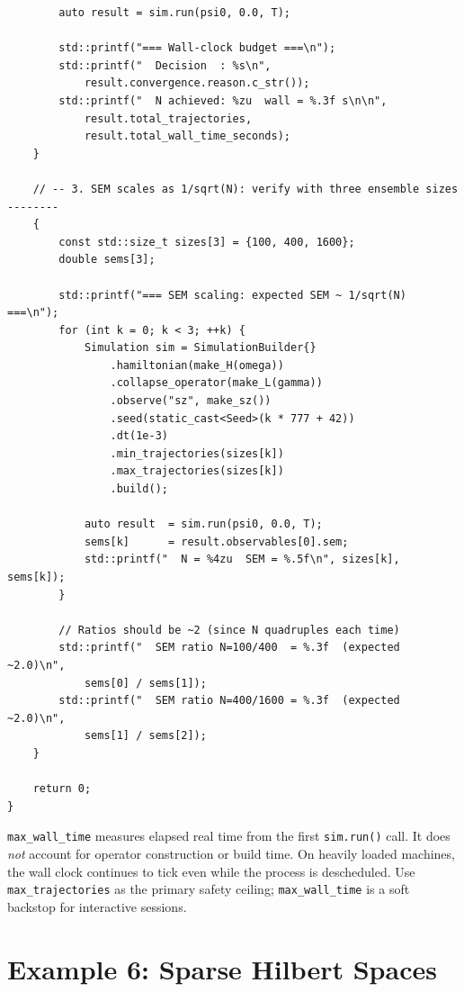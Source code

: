 \documentclass[11pt,a4paper,twoside]{book}
\newcommand{\code}[1]{\texttt{\small#1}}
\theoremstyle{definition}
\theoremstyle{remark}
\begin{document}
\begin{verbatim}
        auto result = sim.run(psi0, 0.0, T);

        std::printf("=== Wall-clock budget ===\n");
        std::printf("  Decision  : %s\n",
            result.convergence.reason.c_str());
        std::printf("  N achieved: %zu  wall = %.3f s\n\n",
            result.total_trajectories,
            result.total_wall_time_seconds);
    }

    // -- 3. SEM scales as 1/sqrt(N): verify with three ensemble sizes --------
    {
        const std::size_t sizes[3] = {100, 400, 1600};
        double sems[3];

        std::printf("=== SEM scaling: expected SEM ~ 1/sqrt(N) ===\n");
        for (int k = 0; k < 3; ++k) {
            Simulation sim = SimulationBuilder{}
                .hamiltonian(make_H(omega))
                .collapse_operator(make_L(gamma))
                .observe("sz", make_sz())
                .seed(static_cast<Seed>(k * 777 + 42))
                .dt(1e-3)
                .min_trajectories(sizes[k])
                .max_trajectories(sizes[k])
                .build();

            auto result  = sim.run(psi0, 0.0, T);
            sems[k]      = result.observables[0].sem;
            std::printf("  N = %4zu  SEM = %.5f\n", sizes[k], sems[k]);
        }

        // Ratios should be ~2 (since N quadruples each time)
        std::printf("  SEM ratio N=100/400  = %.3f  (expected ~2.0)\n",
            sems[0] / sems[1]);
        std::printf("  SEM ratio N=400/1600 = %.3f  (expected ~2.0)\n",
            sems[1] / sems[2]);
    }

    return 0;
}
\end{verbatim}

\begin{warnbox}
  \code{max\_wall\_time} measures elapsed real time from the first
  \code{sim.run()} call. It does \emph{not} account for operator
  construction or build time. On heavily loaded machines, the wall
  clock continues to tick even while the process is descheduled.
  Use \code{max\_trajectories} as the primary safety ceiling;
  \code{max\_wall\_time} is a soft backstop for interactive sessions.
\end{warnbox}

\section{Example 6: Sparse Hilbert Spaces}
\label{sec:ex-sparse}
\end{document}
